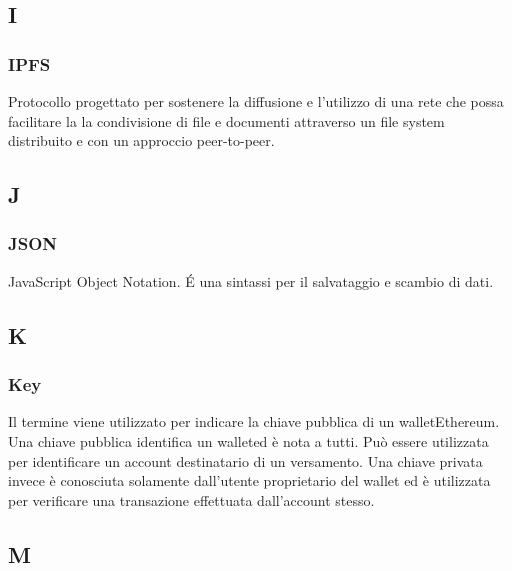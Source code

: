 \subsection*{I}

\subsubsection*{IPFS}
Protocollo progettato per sostenere la diffusione e l'utilizzo di una rete che possa facilitare la la condivisione di file e documenti attraverso un file system distribuito e con un approccio peer-to-peer\glo.

\subsection*{J}

\subsubsection*{JSON}
JavaScript Object Notation. \'E una sintassi per il salvataggio e scambio di dati.


\subsection*{K}

\subsubsection*{Key}
Il termine viene utilizzato per indicare la chiave pubblica di un wallet\glosp Ethereum\glosp. Una chiave pubblica identifica un wallet\glosp ed è nota a tutti. Può essere utilizzata per identificare un account destinatario di un versamento. Una chiave privata invece è conosciuta solamente dall'utente proprietario del wallet ed è utilizzata per verificare una transazione effettuata dall'account stesso. 


\subsection*{M}

